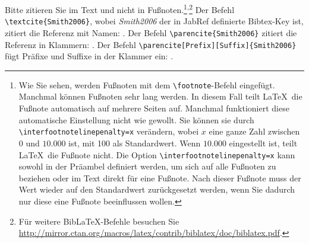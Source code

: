 \documentclass[a4paper,12pt]{scrartcl} %
\begin{document}
Bitte zitieren Sie im Text und nicht in Fußnoten.\footnote{Wie Sie sehen, werden Fußnoten mit dem \texttt{\textbackslash footnote{}}-Befehl eingefügt. Manchmal können Fußnoten sehr lang werden. In diesem Fall teilt \LaTeX\ die Fußnote automatisch auf mehrere Seiten auf. Manchmal funktioniert diese automatische Einstellung nicht wie gewollt. Sie können sie durch \texttt{\textbackslash interfootnotelinepenalty=x} verändern, wobei $x$ eine ganze Zahl zwischen $0$ und $10{.}000$ ist, mit 100 als Standardwert. Wenn $10{.}000$ eingestellt ist, teilt \LaTeX\ die Fußnote nicht. Die Option \texttt{\textbackslash interfootnotelinepenalty=x} kann sowohl in der Präambel definiert werden, um sich auf alle Fußnoten zu beziehen oder im Text direkt für eine Fußnote. Nach dieser Fußnote muss der Wert wieder auf den Standardwert zurückgesetzt werden, wenn Sie dadurch nur diese eine Fußnote beeinflussen wollen.}\textsuperscript{,}\footnote{Für weitere Bib\LaTeX-Befehle besuchen Sie \url{http://mirror.ctan.org/macros/latex/contrib/biblatex/doc/biblatex.pdf}.} Der Befehl \texttt{\textbackslash textcite\{Smith2006\}}, wobei \textit{Smith2006} der in JabRef definierte Bibtex-Key ist, zitiert die Referenz mit Namen: \textcite{Smith2006}. Der Befehl \texttt{\textbackslash parencite\{Smith2006\}} zitiert die Referenz in Klammern: \parencite{Smith2006}. Der Befehl \verb|\parencite[Prefix][Suffix]{Smith2006}| fügt Präfixe und Suffixe in der Klammer ein: \parencite[see e.g.][pp. 1-4]{Smith2006}.\\
\end{document}
